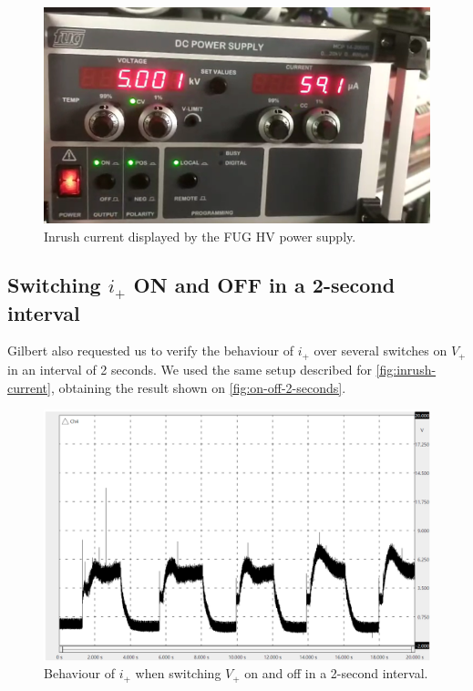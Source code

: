 \documentclass[oneside,12pt]{article}
\begin{document}
\begin{figure}[h!]
    \centering
    \includegraphics[width=\textwidth,trim=1 1 1 1,clip]{figures/inrush-current-fug.png}
    \caption{Inrush current displayed by the FUG HV power supply.}
    \label{fig:inrush-current-fug}
\end{figure}

\subsection{Switching $i_+$ ON and OFF in a 2-second interval}

Gilbert also requested us to verify the behaviour of $i_+$ over several switches on $V_+$ in an interval of 2 seconds. We used the same 
setup described for \autoref{fig:inrush-current}, obtaining the result shown on \autoref{fig:on-off-2-seconds}.

\begin{figure}[h!]
    \centering
    \includegraphics[width=\textwidth,trim=1 1 1 1,clip]{figures/on-off-2-seconds.png}
    \caption{Behaviour of $i_+$ when switching $V_+$ on and off in a 2-second interval.}
    \label{fig:on-off-2-seconds}
\end{figure}
\end{document}

